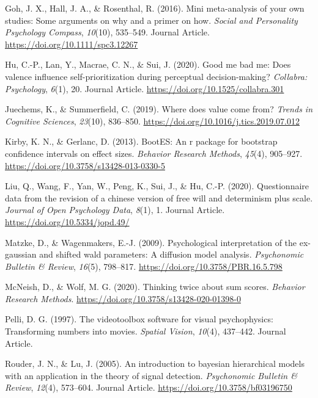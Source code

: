 \documentclass[
  english,
  man]{apa6}
\begin{document}
\leavevmode\hypertarget{ref-Goh_2016_mini}{}%
Goh, J. X., Hall, J. A., \& Rosenthal, R. (2016). Mini meta-analysis of your own studies: Some arguments on why and a primer on how. \emph{Social and Personality Psychology Compass}, \emph{10}(10), 535--549. Journal Article. \url{https://doi.org/10.1111/spc3.12267}

\leavevmode\hypertarget{ref-Hu_2020_GoodSelf}{}%
Hu, C.-P., Lan, Y., Macrae, C. N., \& Sui, J. (2020). Good me bad me: Does valence influence self-prioritization during perceptual decision-making? \emph{Collabra: Psychology}, \emph{6}(1), 20. Journal Article. \url{https://doi.org/10.1525/collabra.301}

\leavevmode\hypertarget{ref-juechems_where_2019}{}%
Juechems, K., \& Summerfield, C. (2019). Where does value come from? \emph{Trends in Cognitive Sciences}, \emph{23}(10), 836--850. \url{https://doi.org/10.1016/j.tics.2019.07.012}

\leavevmode\hypertarget{ref-kirby_bootes_2013}{}%
Kirby, K. N., \& Gerlanc, D. (2013). BootES: An r package for bootstrap confidence intervals on effect sizes. \emph{Behavior Research Methods}, \emph{45}(4), 905--927. \url{https://doi.org/10.3758/s13428-013-0330-5}

\leavevmode\hypertarget{ref-Liu_2020_JOPD}{}%
Liu, Q., Wang, F., Yan, W., Peng, K., Sui, J., \& Hu, C.-P. (2020). Questionnaire data from the revision of a chinese version of free will and determinism plus scale. \emph{Journal of Open Psychology Data}, \emph{8}(1), 1. Journal Article. \url{https://doi.org/10.5334/jopd.49/}

\leavevmode\hypertarget{ref-matzke_psychological_2009}{}%
Matzke, D., \& Wagenmakers, E.-J. (2009). Psychological interpretation of the ex-gaussian and shifted wald parameters: A diffusion model analysis. \emph{Psychonomic Bulletin \& Review}, \emph{16}(5), 798--817. \url{https://doi.org/10.3758/PBR.16.5.798}

\leavevmode\hypertarget{ref-mcneish_thinking_2020}{}%
McNeish, D., \& Wolf, M. G. (2020). Thinking twice about sum scores. \emph{Behavior Research Methods}. \url{https://doi.org/10.3758/s13428-020-01398-0}

\leavevmode\hypertarget{ref-Pelli_1997}{}%
Pelli, D. G. (1997). The videotoolbox software for visual psychophysics: Transforming numbers into movies. \emph{Spatial Vision}, \emph{10}(4), 437--442. Journal Article.

\leavevmode\hypertarget{ref-Rouder_2005_BHM_SDT}{}%
Rouder, J. N., \& Lu, J. (2005). An introduction to bayesian hierarchical models with an application in the theory of signal detection. \emph{Psychonomic Bulletin \& Review}, \emph{12}(4), 573--604. Journal Article. \url{https://doi.org/10.3758/bf03196750}
\end{document}
